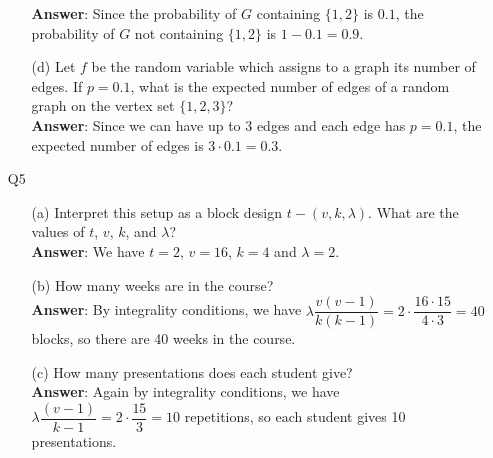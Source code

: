 \documentclass{article}
\begin{document}
\begin{itemize}
\begin{itemize}
                        \textbf{Answer}: Since the probability of $G$ containing $\{1,2\}$ is $0.1$, the probability of $G$ not containing $\{1,2\}$ is $1-0.1=0.9$.
                  \item [(d)] Let $f$ be the random variable which assigns to a graph its number of edges. If $p=0.1$, what is the expected number of edges of a random graph on the vertex set $\{1,2,3\}$?\\
                        \textbf{Answer}: Since we can have up to 3 edges and each edge has $p=0.1$, the expected number of edges is $3\cdot 0.1=0.3$.
            \end{itemize}
\end{itemize}

\newpage
\begin{itemize}
      \item [Q5]
            \begin{itemize}
                  \item [(a)] Interpret this setup as a block design $t-(v,k,\lambda)$. What are the values of $t$, $v$, $k$, and $\lambda$?\\
                  \textbf{Answer}: We have $t=2$, $v=16$, $k=4$ and $\lambda=2$.
                  \item [(b)] How many weeks are in the course?\\
                  \textbf{Answer}: By integrality conditions, we have $\lambda\dfrac{v(v-1)}{k(k-1)}=2\cdot\dfrac{16\cdot 15}{4\cdot 3}=40$ blocks, so there are 40 weeks in the course.
                  \item [(c)] How many presentations does each student give?\\
                  \textbf{Answer}: Again by integrality conditions, we have $\lambda\dfrac{(v-1)}{k-1}=2\cdot\dfrac{15}{3}=10$ repetitions, so each student gives 10 presentations.
            \end{itemize}
\end{itemize}
\end{document}
